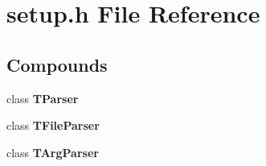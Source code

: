 \section{setup.h File Reference}
\label{setup.h}


\subsection*{Compounds}
\begin{CompactItemize}
\item 
class {\bf TParser}
\item 
class {\bf TFile\-Parser}
\item 
class {\bf TArg\-Parser}
\end{CompactItemize}
